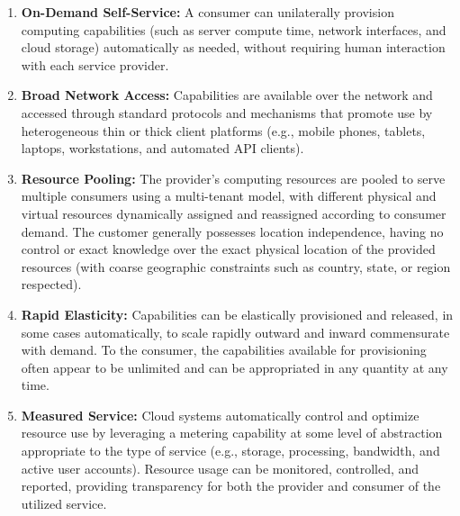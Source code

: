 \begin{enumerate}[label=\bfseries\arabic*.]
    \item \textbf{On-Demand Self-Service:} A consumer can unilaterally provision computing capabilities (such as server compute time, network interfaces, and cloud storage) automatically as needed, without requiring human interaction with each service provider.
    \item \textbf{Broad Network Access:} Capabilities are available over the network and accessed through standard protocols and mechanisms that promote use by heterogeneous thin or thick client platforms (e.g., mobile phones, tablets, laptops, workstations, and automated API clients).
    \item \textbf{Resource Pooling:} The provider's computing resources are pooled to serve multiple consumers using a multi-tenant model, with different physical and virtual resources dynamically assigned and reassigned according to consumer demand. The customer generally possesses location independence, having no control or exact knowledge over the exact physical location of the provided resources (with coarse geographic constraints such as country, state, or region respected).
    \item \textbf{Rapid Elasticity:} Capabilities can be elastically provisioned and released, in some cases automatically, to scale rapidly outward and inward commensurate with demand. To the consumer, the capabilities available for provisioning often appear to be unlimited and can be appropriated in any quantity at any time.
    \item \textbf{Measured Service:} Cloud systems automatically control and optimize resource use by leveraging a metering capability at some level of abstraction appropriate to the type of service (e.g., storage, processing, bandwidth, and active user accounts). Resource usage can be monitored, controlled, and reported, providing transparency for both the provider and consumer of the utilized service.
\end{enumerate}

